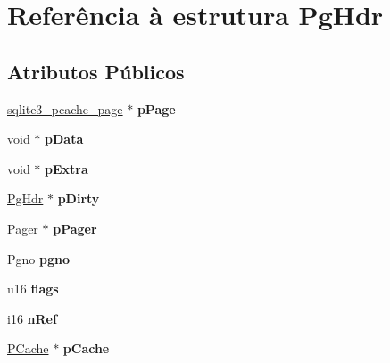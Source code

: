 \hypertarget{struct_pg_hdr}{\section{Referência à estrutura Pg\-Hdr}
\label{struct_pg_hdr}
}
\subsection*{Atributos Públicos}
\begin{DoxyCompactItemize}
\item 
\hypertarget{struct_pg_hdr_aa5645976ba0634993a7304dce8856c8b}{\hyperlink{structsqlite3__pcache__page}{sqlite3\-\_\-pcache\-\_\-page} $\ast$ {\bfseries p\-Page}}\label{struct_pg_hdr_aa5645976ba0634993a7304dce8856c8b}

\item 
\hypertarget{struct_pg_hdr_a0f9f2ac8492c0cdad5898036db20b798}{void $\ast$ {\bfseries p\-Data}}\label{struct_pg_hdr_a0f9f2ac8492c0cdad5898036db20b798}

\item 
\hypertarget{struct_pg_hdr_a8ff7430ed04077f1ae20d10801968164}{void $\ast$ {\bfseries p\-Extra}}\label{struct_pg_hdr_a8ff7430ed04077f1ae20d10801968164}

\item 
\hypertarget{struct_pg_hdr_a7732b1c0f19d9555ac93d4879fc95bbd}{\hyperlink{struct_pg_hdr}{Pg\-Hdr} $\ast$ {\bfseries p\-Dirty}}\label{struct_pg_hdr_a7732b1c0f19d9555ac93d4879fc95bbd}

\item 
\hypertarget{struct_pg_hdr_aaa4879a9510c8a819a1e10a8ee21495b}{\hyperlink{struct_pager}{Pager} $\ast$ {\bfseries p\-Pager}}\label{struct_pg_hdr_aaa4879a9510c8a819a1e10a8ee21495b}

\item 
\hypertarget{struct_pg_hdr_ab6e2223e410acf9bae7f12f1b1293589}{Pgno {\bfseries pgno}}\label{struct_pg_hdr_ab6e2223e410acf9bae7f12f1b1293589}

\item 
\hypertarget{struct_pg_hdr_a8ef58380f7e04f1e3c76fa208e227f95}{u16 {\bfseries flags}}\label{struct_pg_hdr_a8ef58380f7e04f1e3c76fa208e227f95}

\item 
\hypertarget{struct_pg_hdr_ac68c685d117788c18849e8853dd419d5}{i16 {\bfseries n\-Ref}}\label{struct_pg_hdr_ac68c685d117788c18849e8853dd419d5}

\item 
\hypertarget{struct_pg_hdr_a557aeaddd1b0805815ce06f1bfd27782}{\hyperlink{struct_p_cache}{P\-Cache} $\ast$ {\bfseries p\-Cache}}\label{struct_pg_hdr_a557aeaddd1b0805815ce06f1bfd27782}


\end{DoxyCompactItemize}
